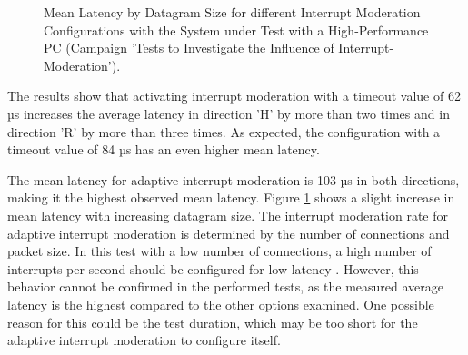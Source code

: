 \begin{figure}[h!]
  \centering
  \caption{Mean Latency by Datagram Size for different Interrupt Moderation Configurations with the System under Test with a High-Performance PC (Campaign 'Tests to Investigate the Influence of Interrupt-Moderation').}
  \label{fig:IMean}
\end{figure}

The results show that activating interrupt moderation with a timeout value of 62 µs increases the average latency in direction 'H' by more than two times and in direction 'R' by more than three times. As expected, the configuration with a timeout value of 84 µs has an even higher mean latency.

The mean latency for adaptive interrupt moderation is 103 µs in both directions, making it the highest observed mean latency. Figure \ref{fig:IMean} shows a slight increase in mean latency with increasing datagram size. The interrupt moderation rate for adaptive interrupt moderation is determined by the number of connections and packet size. In this test with a low number of connections, a high number of interrupts per second should be configured for low latency \cite{intermod04}. However, this behavior cannot be confirmed in the performed tests, as the measured average latency is the highest compared to the other options examined. One possible reason for this could be the test duration, which may be too short for the adaptive interrupt moderation to configure itself.

